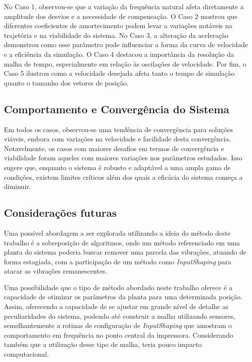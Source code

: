 No Caso 1, observou-se que a variação da frequência natural afeta diretamente a amplitude dos desvios e a necessidade de compensação. O Caso 2 mostrou que diferentes coeficientes de amortecimento podem levar a variações notáveis na trajetória e na viabilidade do sistema. No Caso 3, a alteração da aceleração demonstrou como esse parâmetro pode influenciar a forma da curva de velocidade e a eficiência da simulação. O Caso 4 destacou a importância da resolução da malha de tempo, especialmente em relação às oscilações de velocidade. Por fim, o Caso 5 ilustrou como a velocidade desejada afeta tanto o tempo de simulação quanto o tamanho dos vetores de posição.

\subsection{Comportamento e Convergência do Sistema}
Em todos os casos, observou-se uma tendência de convergência para soluções viáveis, embora com variações na velocidade e facilidade desta convergência. Notavelmente, os casos com maiores desafios em termos de convergência e viabilidade foram aqueles com maiores variações nos parâmetros estudados. Isso sugere que, enquanto o sistema é robusto e adaptável a uma ampla gama de condições, existem limites críticos além dos quais a eficácia do sistema começa a diminuir.

\subsection{Considerações futuras}
Uma possível abordagem a ser explorada utilizando a ideia do método deste trabalho é a sobreposição de algoritmos, onde
um método referenciado em uma planta do sistema poderia buscar remover uma parcela das vibrações, atuando de forma estagiada,
com a participação de um método como \textit{InputShaping} para atacar as vibrações remanescentes.

Uma possibilidade que o tipo de método abordado neste trabalho oferece é a capacidade de otimizar os parâmetros da planta para uma determinada posição.
Assim, oferecendo a capacidade de se ajustar em grande nível de detalhe as peculiaridades do sistema, podendo até
construir a malha utilizando sensores, semelhantemente a rotinas de configuração de \textit{InputShaping} que amostram
o comportamento em frequência no ponto central da impressora. Considerando também que a utilização desse tipo de malha,
teria pouco impacto computacional.


